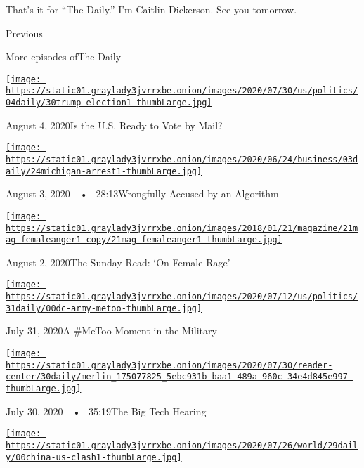 That's it for ``The Daily.'' I'm Caitlin Dickerson. See you tomorrow.

Previous

More episodes ofThe Daily

\href{https://www.nytimes3xbfgragh.onion/2020/08/04/podcasts/the-daily/mail-in-voting-president-trump.html?action=click\&module=audio-series-bar\&region=header\&pgtype=Article}{\texttt{[image: https://static01.graylady3jvrrxbe.onion/images/2020/07/30/us/politics/04daily/30trump-election1-thumbLarge.jpg]}}

August 4, 2020Is the U.S. Ready to Vote by Mail?

\href{https://www.nytimes3xbfgragh.onion/2020/08/03/podcasts/the-daily/algorithmic-justice-racism.html?action=click\&module=audio-series-bar\&region=header\&pgtype=Article}{\texttt{[image: https://static01.graylady3jvrrxbe.onion/images/2020/06/24/business/03daily/24michigan-arrest1-thumbLarge.jpg]}}

August 3, 2020~~•~ 28:13Wrongfully Accused by an Algorithm

\href{https://www.nytimes3xbfgragh.onion/2020/08/02/podcasts/the-daily/on-female-rage.html?action=click\&module=audio-series-bar\&region=header\&pgtype=Article}{\texttt{[image: https://static01.graylady3jvrrxbe.onion/images/2018/01/21/magazine/21mag-femaleanger1-copy/21mag-femaleanger1-thumbLarge.jpg]}}

August 2, 2020The Sunday Read: `On Female Rage'

\href{https://www.nytimes3xbfgragh.onion/2020/07/31/podcasts/the-daily/vanessa-guillen-military-metoo.html?action=click\&module=audio-series-bar\&region=header\&pgtype=Article}{\texttt{[image: https://static01.graylady3jvrrxbe.onion/images/2020/07/12/us/politics/31daily/00dc-army-metoo-thumbLarge.jpg]}}

July 31, 2020A \#MeToo Moment in the Military

\href{https://www.nytimes3xbfgragh.onion/2020/07/30/podcasts/the-daily/congress-facebook-amazon-google-apple.html?action=click\&module=audio-series-bar\&region=header\&pgtype=Article}{\texttt{[image: https://static01.graylady3jvrrxbe.onion/images/2020/07/30/reader-center/30daily/merlin\_175077825\_5ebc931b-baa1-489a-960c-34e4d845e997-thumbLarge.jpg]}}

July 30, 2020~~•~ 35:19The Big Tech Hearing

\href{https://www.nytimes3xbfgragh.onion/2020/07/29/podcasts/the-daily/china-trump-foreign-policy.html?action=click\&module=audio-series-bar\&region=header\&pgtype=Article}{\texttt{[image: https://static01.graylady3jvrrxbe.onion/images/2020/07/26/world/29daily/00china-us-clash1-thumbLarge.jpg]}}

